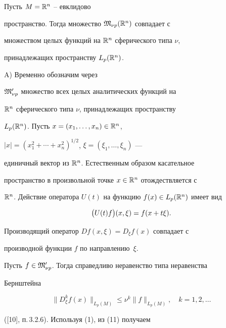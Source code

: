 \begin{thm}


Пусть $M=\Bbb R^n$ -- евклидово


пространство. Тогда множество $\frak M_{\nu p}(\Bbb R^n)$ совпадает с


множеством целых функций на $\Bbb R^n$ сферического типа $\nu$,


принадлежащих пространству $L_p(\Bbb R^n)$.


\end{thm}





\begin{pf}


A) Временно обозначим через


$\frak M'_{\nu p}$ множество всех целых аналитических функций на


$\Bbb R^n$ сферического типа $\nu$, принадлежащих пространству


$L_p(\Bbb R^n)$. Пусть $x=(x_1,\dotsc, x_n)\in\Bbb R^n$,


$|x|=(x_1^2+\dotsb +x_n^2)^{1/2}$, $\xi=(\xi_1,\dotsc,\xi_n)$ ---


единичный вектор из $\Bbb R^n$. Естественным образом касательное


пространство в произвольной точке $x\in\Bbb R^n$ отождествляется с


$\Ra^n$. Действие оператора $U(t)$ на функцию $f(x)\in


L_p(\Ra^n)$ имеет вид


$$


\bl U(t)f\br(x,\xi)=f(x+t\xi).


$$


Производящий оператор $Df(x,\xi)=D_\xi f(x)$ совпадает с


производной функции $f$ по направлению~$\xi$.





Пусть $f\in\frak M'_{\nu p}$. Тогда справедливо неравенство типа неравенства


Бернштейна


\begin{equation}


\|D_\xi^k f(x)\|_{L_p(M)}\le\nu^k\|f\|_{L_p(M)},\quad


k=1,2,\dotsc


\end{equation}


([10], п.\,3.2.6). Используя (1), из (11) получаем



\end{pf}
